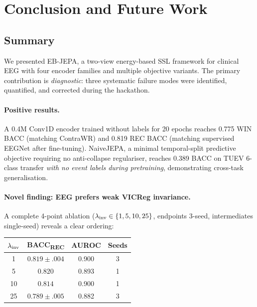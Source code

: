 \documentclass[11pt,a4paper]{article}
\begin{document}
\section{Conclusion and Future Work}
\label{sec:conclusion}

\subsection{Summary}

We presented EB-JEPA, a two-view energy-based SSL framework for clinical EEG with four
encoder families and multiple objective variants.
The primary contribution is \emph{diagnostic}: three systematic failure modes were
identified, quantified, and corrected during the hackathon.

\paragraph{Positive results.}
A 0.4M Conv1D encoder trained without labels for 20 epochs reaches 0.775 WIN BACC
(matching ContraWR) and 0.819 REC BACC (matching supervised EEGNet after fine-tuning).
NaiveJEPA, a minimal temporal-split predictive objective requiring no anti-collapse
regulariser, reaches 0.389 BACC on TUEV 6-class transfer \emph{with no event labels
during pretraining}, demonstrating cross-task generalisation.

\paragraph{Novel finding: EEG prefers weak VICReg invariance.}
A complete 4-point ablation ($\lambda_{\rm inv} \in \{1, 5, 10, 25\}$, endpoints
3-seed, intermediates single-seed) reveals a clear ordering:

\begin{center}\small
\begin{tabular}{cccc}
\toprule
$\lambda_{\rm inv}$ & BACC\textsubscript{REC} & AUROC & Seeds \\
\midrule
1 & $0.819 \pm .004$ & 0.900 & 3 \\
5 & $0.820$ & 0.893 & 1 \\
10 & $0.814$ & 0.900 & 1 \\
25 & $0.789 \pm .005$ & 0.882 & 3 \\
\bottomrule
\end{tabular}
\end{center}
\end{document}
